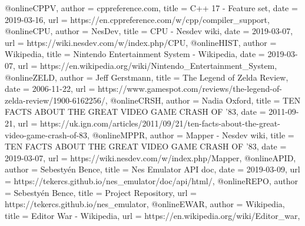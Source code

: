@online{CPPV,
	author = {cppreference.com},
	title = {C++ 17 - Feature set},
	date = {2019-03-16},
	url = {https://en.cppreference.com/w/cpp/compiler_support},
}
@online{CPU,
	author = {NesDev},
	title = {CPU - Nesdev wiki},
	date = {2019-03-07},
	url = {https://wiki.nesdev.com/w/index.php/CPU},
}
@online{HIST,
	author = {Wikipedia},
	title = {Nintendo Entertainment System - Wikipedia},
	date = {2019-03-07},
	url = {https://en.wikipedia.org/wiki/Nintendo_Entertainment_System},
}
@online{ZELD,
	author = {Jeff Gerstmann},
	title = {The Legend of Zelda Review},
	date = {2006-11-22},
	url = {https://www.gamespot.com/reviews/the-legend-of-zelda-review/1900-6162256/},
}
@online{CRSH,
	author = {Nadia Oxford},
	title = {TEN FACTS ABOUT THE GREAT VIDEO GAME CRASH OF '83},
	date = {2011-09-21},
	url = {https://uk.ign.com/articles/2011/09/21/ten-facts-about-the-great-video-game-crash-of-83},
}
@online{MPPR,
	author = {Mapper - Nesdev wiki},
	title = {TEN FACTS ABOUT THE GREAT VIDEO GAME CRASH OF '83},
	date = {2019-03-07},
	url = {https://wiki.nesdev.com/w/index.php/Mapper},
}
@online{APID,
	author = {Sebestyén Bence},
	title = {Nes Emulator API doc},
	date = {2019-03-09},
	url = {https://tekercs.github.io/nes_emulator/doc/api/html/},
}
@online{REPO,
	author = {Sebestyén Bence},
	title = {Project Repository},
	url = {https://tekercs.github.io/nes_emulator},
}
@online{EWAR,
	author = {Wikipedia},
	title = {Editor War - Wikipedia},
	url = {https://en.wikipedia.org/wiki/Editor_war},
}

